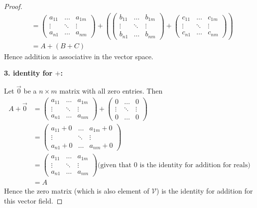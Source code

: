 \documentclass{article}
\begin{document}
\begin{proof}
\begin{align*}
&= \begin{pmatrix} a_{11} & \ldots & a_{1m} \\ \vdots &  \ddots & \vdots \\ a_{n1} &  \ldots & a_{nm} \end{pmatrix} +  (\begin{pmatrix} b_{11} &  \ldots & b_{1m} \\  \vdots & \ddots & \vdots \\ b_{n1} &  \ldots & b_{nm} \end{pmatrix} + \begin{pmatrix} c_{11} &  \ldots & c_{1m} \\ \vdots & \ddots & \vdots \\ c_{n1} & \ldots & c_{nm} \end{pmatrix}) \\
&= A + (B+ C)
\end{align*}
Hence addition is associative in the vector space.
\smallskip

\textbf{3. identity for $+$:}

Let $\vec{0}$ be a $n \times m$ matrix with all zero entries. Then
\begin{align*}
A + \vec{0} &= \begin{pmatrix} a_{11} & \ldots & a_{1m} \\ \vdots &  \ddots & \vdots \\ a_{n1} &  \ldots & a_{nm} \end{pmatrix} + \begin{pmatrix} 0 & \ldots & 0 \\ \vdots & \ddots & \vdots \\ 0 & \ldots & 0 \end{pmatrix} \\
&=  \begin{pmatrix} a_{11} + 0 & \ldots & a_{1m} +0  \\ \vdots &  \ddots & \vdots \\ a_{n1} +0 &  \ldots & a_{nm} +0 \end{pmatrix} \\
&= \begin{pmatrix} a_{11} & \ldots & a_{1m} \\ \vdots &  \ddots & \vdots \\ a_{n1} &  \ldots & a_{nm} \end{pmatrix} \text{(given that $0$ is the identity for addition for reals)} \\
&= A
\end{align*}
Hence the zero matrix (which is also element of $\mathcal{V}$) is the identity for addition for this vector field.
\smallskip


\end{proof}
\end{document}
